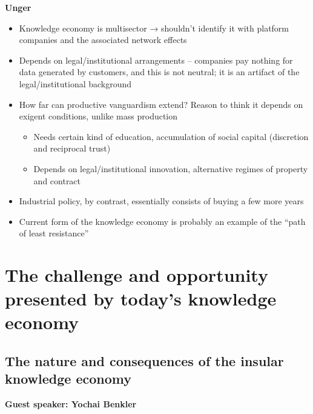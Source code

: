 \textbf{Unger}

\begin{itemize}
\tightlist
\item
  Knowledge economy is multisector → shouldn't identify it with platform
  companies and the associated network effects
\item
  Depends on legal/institutional arrangements -- companies pay nothing
  for data generated by customers, and this is not neutral; it is an
  artifact of the legal/institutional background
\item
  How far can productive vanguardism extend? Reason to think it depends
  on exigent conditions, unlike mass production

  \begin{itemize}
  \tightlist
  \item
    Needs certain kind of education, accumulation of social capital
    (discretion and reciprocal trust)
  \item
    Depends on legal/institutional innovation, alternative regimes of
    property and contract
  \end{itemize}
\item
  Industrial policy, by contrast, essentially consists of buying a few
  more years
\item
  Current form of the knowledge economy is probably an example of the
  ``path of least resistance''
\end{itemize}

\hypertarget{the-challenge-and-opportunity-presented-by-todays-knowledge-economy}{%
\section{The challenge and opportunity presented by today's knowledge
economy}\label{the-challenge-and-opportunity-presented-by-todays-knowledge-economy}}

\hypertarget{the-nature-and-consequences-of-the-insular-knowledge-economy}{%
\subsection{The nature and consequences of the insular knowledge
economy}\label{the-nature-and-consequences-of-the-insular-knowledge-economy}}

\textbf{Guest speaker: Yochai Benkler}

